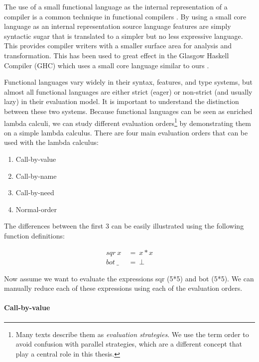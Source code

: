 The use of a small functional language as the internal representation of a
compiler is a common technique in functional compilers \cite{dutchBook,
PeytonJones:IFL, Augustsson:LazyMLCompiler, UHC}. By using a small core
language as an internal representation source language features are simply
syntactic sugar that is translated to a simpler but no less expressive
language. This provides compiler writers with a smaller surface area for
analysis and transformation. This has been used to great effect in the Glasgow
Haskell Compiler (GHC) which uses a small core language similar to ours
\cite{peyton2002secrets, jones1998transformation}. 

Functional languages vary widely in their syntax, features, and type systems,
but almost all functional languages are either strict (eager) or non-strict
(and usually lazy) in their evaluation model. It is important to understand the
distinction between these two systems. Because functional languages can be
seen as enriched lambda calculi, we can study different evaluation
orders\footnote{Many texts describe them as \emph{evaluation strategies}.  We
use the term order to avoid confusion with parallel strategies, which are a
different concept that play a central role in this thesis.} by demonstrating
them on a simple lambda calculus. There are four main evaluation orders that
can be used with the lambda calculus:

    \begin{enumerate}
        \item Call-by-value
        \item Call-by-name
        \item Call-by-need
        \item Normal-order
    \end{enumerate}

The differences between the first 3 can be easily illustrated using the
following function definitions:

\begin{align*}
    sqr \ x \  &= \  x * x \\
    bot \ \_ \ &= \  \bot
\end{align*}

Now assume we want to evaluate the expressions \<sqr (5*5)\> and \<bot (5*5)\>.
We can manually reduce each of these expressions using each of the evaluation
orders.

\paragraph{Call-by-value}

